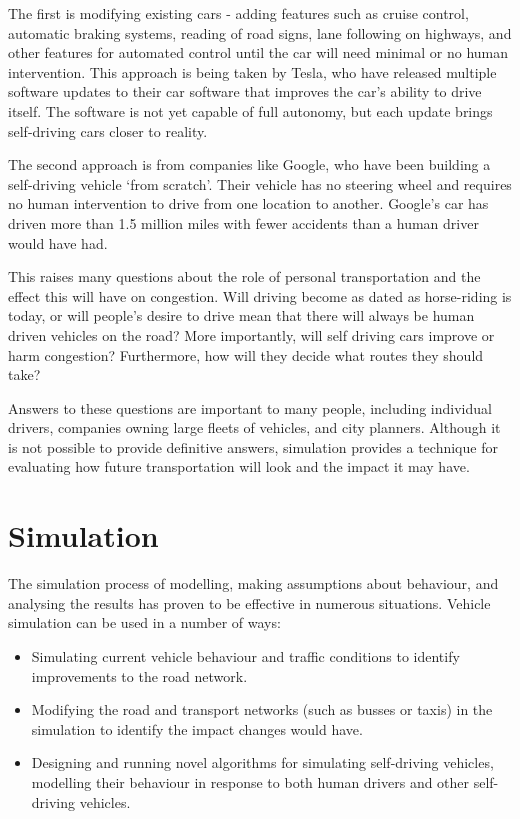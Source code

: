 \documentclass[ %
                    author={Alexander Hill},
                supervisor={Dr. Benjamin Sach},
                    degree={MEng},
                     title={MARMOSET},
                  subtitle={Multi-Agent Route Management using Online Simulation for Efficient Transportation},
                      type={research},
                      year={2016} ]{dissertation}
\begin{document}
The first is modifying existing cars - adding features such as cruise control,
automatic braking systems, reading of road signs, lane following on highways,
and other features for automated control until the car will need minimal or no
human intervention. This approach is being taken by Tesla, who have released
multiple software updates to their car software that improves the car's ability
to drive itself. The software is not yet capable of full autonomy, but each
update brings self-driving cars closer to reality.

The second approach is from companies like Google, who have been building a
self-driving vehicle `from scratch'. Their vehicle has no steering wheel and
requires no human intervention to drive from one location to another.  Google's
car has driven more than 1.5 million miles with fewer accidents than a human
driver would have had.

This raises many questions about the role of personal transportation and the
effect this will have on congestion. Will driving become as dated as
horse-riding is today, or will people's desire to drive mean that there will
always be human driven vehicles on the road? More importantly, will self driving
cars improve or harm congestion? Furthermore, how will they decide what routes
they should take?

Answers to these questions are important to many people, including individual
drivers, companies owning large fleets of vehicles, and city planners. Although
it is not possible to provide definitive answers, simulation provides a
technique for evaluating how future transportation will look and the impact it
may have.

\section{Simulation}

The simulation process of modelling, making assumptions about behaviour, and
analysing the results has proven to be effective in numerous situations.
Vehicle simulation can be used in a number of ways:

\begin{itemize}
    \item Simulating current vehicle behaviour and traffic conditions to
        identify improvements to the road network.
    \item Modifying the road and transport networks (such as busses or taxis) in
        the simulation to identify the impact changes would have.
    \item Designing and running novel algorithms for simulating self-driving
        vehicles, modelling their behaviour in response to both human drivers
        and other self-driving vehicles.
\end{itemize}
\end{document}
